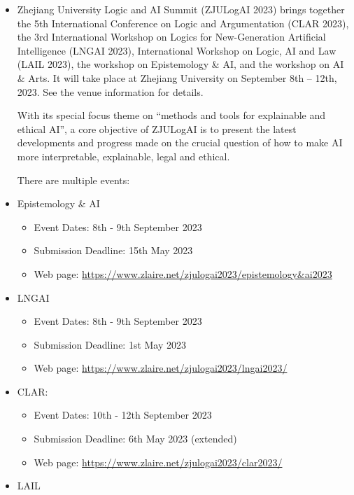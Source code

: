\documentclass[prodmode,acmtecs]{acmsmall} %
\begin{document}
\begin{itemize}\item  Zhejiang University Logic and AI Summit (ZJULogAI 2023) brings together the 5th International Conference on Logic and Argumentation (CLAR 2023), the 3rd International Workshop on Logics for New-Generation Artificial Intelligence (LNGAI 2023), International Workshop on Logic, AI and Law (LAIL 2023), the workshop on Epistemology \& AI, and the workshop on AI \& Arts. It will take place at Zhejiang University on September 8th – 12th, 2023. See the venue information for details. 
 
  With its special focus theme on “methods and tools for explainable and ethical AI”, a core objective of ZJULogAI is to present the latest developments and progress made on the crucial question of how to make AI more interpretable, explainable, legal and ethical. 
 
  There are multiple events: 
 
\item   Epistemology \& AI 
 
\begin{itemize}\item  Event Dates: 8th - 9th September 2023  
\item  Submission Deadline: 15th May 2023
\item  Web page: \href{https://www.zlaire.net/zjulogai2023/epistemology\&ai2023}{https://www.zlaire.net/zjulogai2023/epistemology\&ai2023} 
\end{itemize} 
\item   LNGAI 
 
\begin{itemize}\item  Event Dates: 8th - 9th September 2023
\item  Submission Deadline: 1st May 2023
\item  Web page: \href{https://www.zlaire.net/zjulogai2023/lngai2023/}{https://www.zlaire.net/zjulogai2023/lngai2023/}
\end{itemize} 
\item   CLAR:  
 
\begin{itemize}\item  Event Dates: 10th - 12th September 2023 
\item  Submission Deadline: 6th May 2023 (extended)
\item  Web page: \href{https://www.zlaire.net/zjulogai2023/clar2023/}{https://www.zlaire.net/zjulogai2023/clar2023/} 
\end{itemize} 
\item   LAIL 
 

\end{itemize}
\end{document}
